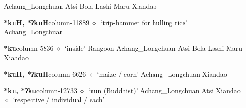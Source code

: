         Achang\_Longchuan 
\hspace{1ex}
         Atsi 
\hspace{1ex}
         Bola 
\hspace{1ex}
         Lashi 
\hspace{1ex}
         Maru 
\hspace{1ex}
         Xiandao 
  \item {\footnotesize \textbf{*kuH, *ʔkuH}}{\tiny column-11889}
         $\diamond$~`trip-hammer for hulling rice'
         Achang\_Longchuan 
  \item {\footnotesize \textbf{*ku}}{\tiny column-5836}
         $\diamond$~`inside'
         Rangoon 
\hspace{1ex}
         Achang\_Longchuan 
\hspace{1ex}
         Atsi 
\hspace{1ex}
         Bola 
\hspace{1ex}
         Lashi 
\hspace{1ex}
         Maru 
\hspace{1ex}
         Xiandao 
  \item {\footnotesize \textbf{*kuH, *ʔkuH}}{\tiny column-6626}
         $\diamond$~`maize / corn'
         Achang\_Longchuan 
\hspace{1ex}
         Xiandao 
  \item {\footnotesize \textbf{*ku, *ʔku}}{\tiny column-12733}
         $\diamond$~`nun (Buddhist)'
         Achang\_Longchuan 
\hspace{1ex}
         Atsi 
\hspace{1ex}
         Xiandao 
\hspace{1ex}
         $\diamond$~`respective / individual / each'

